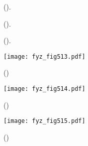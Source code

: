   \begin{figure}[hb!] %
    \centering
     \newline
    \caption{
             (\cite[s.~601]{Feynman01}).}
    \label{fyz:fig510}
  \end{figure}

  \begin{figure}[hb!] %
    \centering
     \newline
    \caption{
             (\cite[s.~601]{Feynman01}).}
    \label{fyz:fig511}
  \end{figure}

  \begin{figure}[hb!] %
    \centering
     \newline
    \caption{
             (\cite[s.~601]{Feynman01}).}
    \label{fyz:fig512}
  \end{figure}

  \begin{figure}[ht!] %
    \centering
    \texttt{[image: fyz\_fig513.pdf]}
    \caption{
             (\cite[s.~697]{Feynman01})}
    \label{fyz:fig513}
  \end{figure}

  \begin{figure}[ht!] %
    \centering
    \texttt{[image: fyz\_fig514.pdf]}
    \caption{
             (\cite[s.~697]{Feynman01})}
    \label{fyz:fig514}
  \end{figure}

  \begin{figure}[ht!] %
    \centering
    \texttt{[image: fyz\_fig515.pdf]}
    \caption{
             (\cite[s.~697]{Feynman01})}
    \label{fyz:fig515}
  \end{figure}
 
